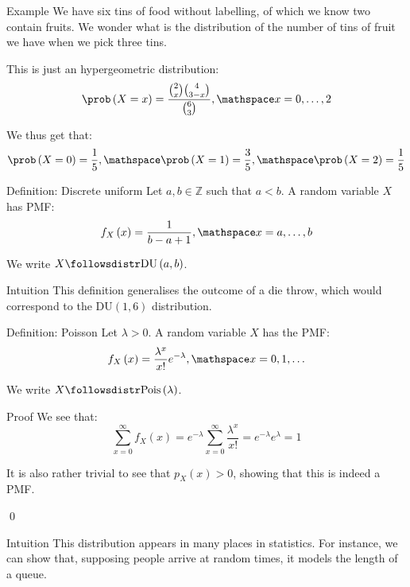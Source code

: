 \documentclass[a4paper]{article}
\begin{document}
\begin{parag}{Example}
    We have six tins of food without labelling, of which we know two contain fruits. We wonder what is the distribution of the number of tins of fruit we have when we pick three tins.

    This is just an hypergeometric distribution: 
    \[\prob\left(X = x\right) = \frac{\binom{2}{x}\binom{4}{3-x}}{\binom{6}{3}}, \mathspace x = 0, \ldots, 2\]
    
    We thus get that: 
    \[\prob\left(X = 0\right) = \frac{1}{5}, \mathspace \prob\left(X = 1\right) = \frac{3}{5}, \mathspace \prob\left(X = 2\right) = \frac{1}{5}\]
\end{parag}

\begin{parag}{Definition: Discrete uniform}
    Let $a, b \in \mathbb{Z}$ such that $a < b$. A  random variable $X$ has PMF: 
    \[f_X\left(x\right) = \frac{1}{b-a+1}, \mathspace x = a, \ldots, b\]
    
    We write $X \followsdistr \text{DU}\left(a, b\right)$.

    \begin{subparag}{Intuition}
        This definition generalises the outcome of a die throw, which would correspond to the $\text{DU}\left(1, 6\right)$ distribution.
    \end{subparag}
\end{parag}

\begin{parag}{Definition: Poisson}
    Let $\lambda > 0$. A  random variable $X$ has the PMF: 
    \[f_X\left(x\right) = \frac{\lambda^x}{x!}e^{-\lambda}, \mathspace x = 0, 1, \ldots\]

    We write $X \followsdistr \text{Pois}\left(\lambda\right)$.
    
    \begin{subparag}{Proof}
        We see that: 
        \[\sum_{x=0}^{\infty} f_X\left(x\right) = e^{-\lambda}\sum_{x=0}^{\infty} \frac{\lambda^x}{x!} = e^{-\lambda} e^{\lambda} = 1\]

        It is also rather trivial to see that $p_X\left(x\right) > 0$, showing that this is indeed a PMF.

        \qed
    \end{subparag}
    
    \begin{subparag}{Intuition}
        This distribution appears in many places in statistics. For instance, we can show that, supposing people arrive at random times, it models the length of a queue.
    \end{subparag}
\end{parag}
\end{document}
